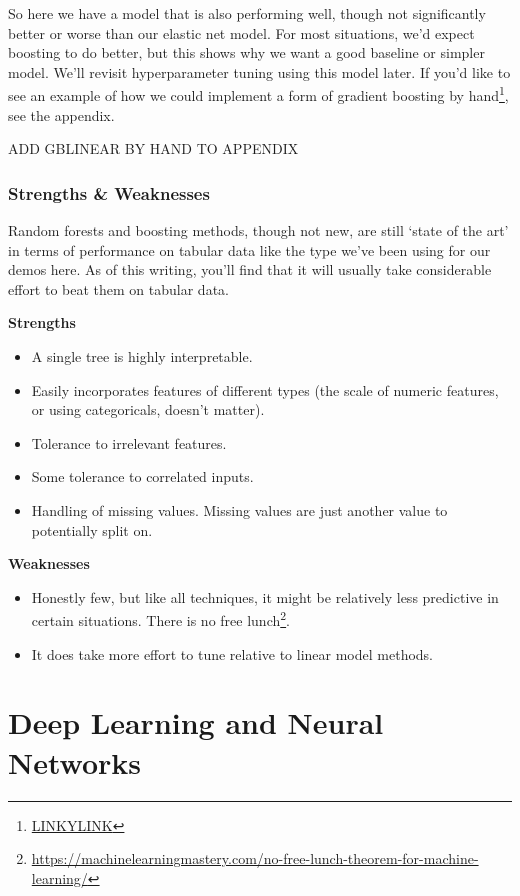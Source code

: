 \documentclass[
  letterpaper,
]{krantz}
\providecommand{\tightlist}{%
  \setlength{\itemsep}{0pt}\setlength{\parskip}{0pt}}\usepackage{longtable,booktabs,array}
\DeclareRobustCommand{\href}[2]{#2\footnote{\url{#1}}}
\begin{document}
So here we have a model that is also performing well, though not
significantly better or worse than our elastic net model. For most
situations, we'd expect boosting to do better, but this shows why we
want a good baseline or simpler model. We'll revisit hyperparameter
tuning using this model later. If you'd like to see an example of how we
could implement a form of \href{LINKYLINK}{gradient boosting by hand},
see the appendix.

ADD GBLINEAR BY HAND TO APPENDIX

\subsubsection{Strengths \& Weaknesses}\label{strengths-weaknesses-1}

Random forests and boosting methods, though not new, are still `state of
the art' in terms of performance on tabular data like the type we've
been using for our demos here. As of this writing, you'll find that it
will usually take considerable effort to beat them on tabular data.

\textbf{Strengths}

\begin{itemize}
\tightlist
\item
  A single tree is highly interpretable.
\item
  Easily incorporates features of different types (the scale of numeric
  features, or using categoricals, doesn't matter).
\item
  Tolerance to irrelevant features.
\item
  Some tolerance to correlated inputs.
\item
  Handling of missing values. Missing values are just another value to
  potentially split on.
\end{itemize}

\textbf{Weaknesses}

\begin{itemize}
\tightlist
\item
  Honestly few, but like all techniques, it might be relatively less
  predictive in certain situations. There is
  \href{https://machinelearningmastery.com/no-free-lunch-theorem-for-machine-learning/}{no
  free lunch}.
\item
  It does take more effort to tune relative to linear model methods.
\end{itemize}

\section{Deep Learning and Neural Networks}\label{sec-ml-dl-nn}
\end{document}
